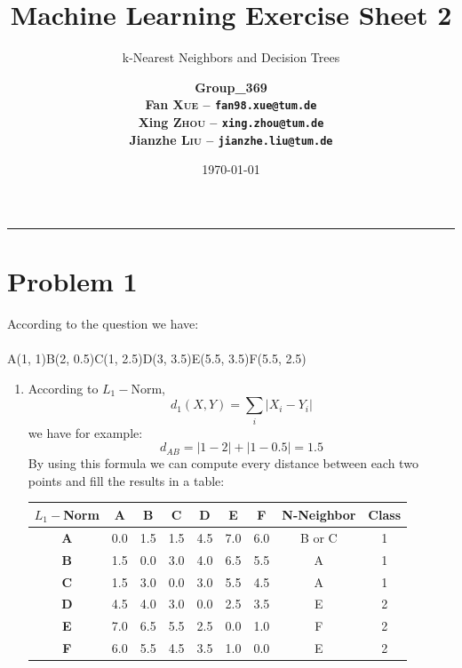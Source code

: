 \documentclass[12pt]{scrartcl}
\title{\large Machine Learning Exercise Sheet 2}
\subtitle{\Large k-Nearest Neighbors and Decision Trees}
\author{\large\bfseries Group\_369 \\
        \large Fan \textsc{Xue} -- \texttt{fan98.xue@tum.de} \\
        \large Xing \textsc{Zhou} -- \texttt{xing.zhou@tum.de} \\
        \large Jianzhe \textsc{Liu} -- \texttt{jianzhe.liu@tum.de}}
\date{\large \today}
\begin{document}
  \maketitle
  \vspace{-1cm}
  \noindent\rule{\textwidth}{0.4pt}
 
  
  \section*{Problem 1}

According to the question we have:
\\
\\
A(1, 1)\quad B(2, 0.5)\quad C(1, 2.5)\quad D(3, 3.5)\quad E(5.5, 3.5)\quad F(5.5, 2.5)

    \begin{enumerate}[label=\alph*)]
      \item 
According to $L_1-$Norm,
\[d_1(X, Y) = \sum_{i}\lvert X_i - Y_i \rvert\]
we have for example:
\[d_{AB} = \lvert 1 - 2 \rvert + \lvert 1 - 0.5 \rvert = 1.5\]     
By using this formula we can compute every distance between each two points and fill the results in a table:
\begin{table}[h!]
  \begin{center}
    \begin{tabular}{c|c|c|c|c|c|c|c|c} %
      \textbf{$L_1-$Norm} & \textbf{A} & \textbf{B} & \textbf{C} & \textbf{D} & \textbf{E} & \textbf{F} & \textbf{N-Neighbor} & \textbf{Class}\\
      \hline
      \textbf{A} & 0.0 & \color{red}1.5 & \color{red}1.5 & 4.5 & 7.0 & 6.0 & B or C & 1\\
      \textbf{B} & \color{red}1.5 & 0.0 & 3.0 & 4.0 & 6.5 & 5.5 & A & 1\\
      \textbf{C} & \color{red}1.5 & 3.0 & 0.0 & 3.0 & 5.5 & 4.5 & A & 1\\
      \textbf{D} & 4.5 & 4.0 & 3.0 & 0.0 & \color{red}2.5 & 3.5 & E & 2\\
      \textbf{E} & 7.0 & 6.5 & 5.5 & 2.5 & 0.0 & \color{red}1.0 & F & 2\\
      \textbf{F} & 6.0 & 5.5 & 4.5 & 3.5 & \color{red}1.0 & 0.0 & E & 2\\
    \end{tabular}
  \end{center}
\end{table}


\end{enumerate}
\end{document}
